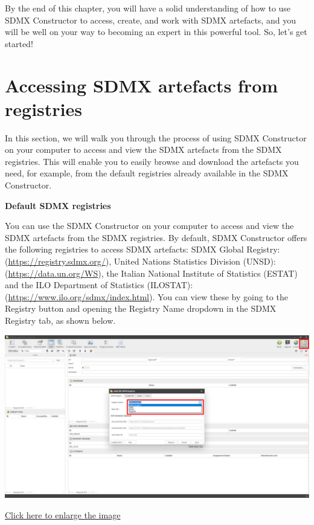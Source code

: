 \documentclass[
]{book}
\theoremstyle{definition}
\theoremstyle{definition}
\theoremstyle{definition}
\theoremstyle{definition}
\theoremstyle{remark}
\begin{document}
By the end of this chapter, you will have a solid understanding of how to use SDMX Constructor to access, create, and work with SDMX artefacts, and you will be well on your way to becoming an expert in this powerful tool. So, let's get started!

\hypertarget{accessing-sdmx}{%
\section{Accessing SDMX artefacts from registries}\label{accessing-sdmx}}

In this section, we will walk you through the process of using SDMX Constructor on your computer to access and view the SDMX artefacts from the SDMX registries. This will enable you to easily browse and download the artefacts you need, for example, from the default registries already available in the SDMX Constructor.

\textbf{Default SDMX registries}

You can use the SDMX Constructor on your computer to access and view the SDMX artefacts from the SDMX registries. By default, SDMX Constructor offers the following registries to access SDMX artefacts: SDMX Global Registry: (\url{https://registry.sdmx.org/}), United Nations Statistics Division (UNSD): (\url{https://data.un.org/WS}), the Italian National Institute of Statistics (ESTAT) and the ILO Department of Statistics (ILOSTAT): (\url{https://www.ilo.org/sdmx/index.html}). You can view these by going to the Registry button and opening the Registry Name dropdown in the SDMX Registry tab, as shown below.

\begin{center}\includegraphics[width=1\linewidth]{./images/image044} \end{center}

\href{images/image044.png}{Click here to enlarge the image}
\end{document}

